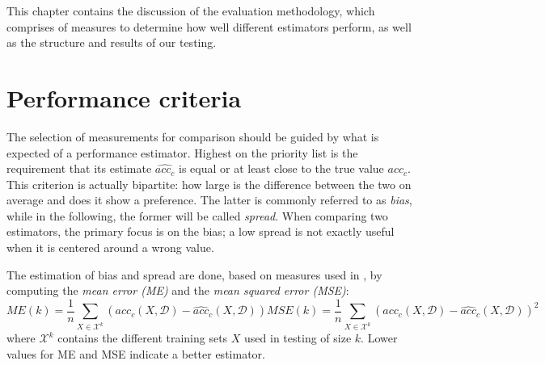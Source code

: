 \label{evaluation}

This chapter contains the discussion of the evaluation methodology, which comprises of measures to determine how well different estimators perform, as well as the structure and results of our testing.

\section{Performance criteria}
\label{evaluation:objective}

The selection of measurements for comparison should be guided by what is expected of a performance estimator. Highest on the priority list is the requirement that its estimate $\widehat{acc_c}$ is equal or at least close to the true value $acc_c$. This criterion is actually bipartite: how large is the difference between the two on average and does it show a preference. The latter is commonly referred to as \textit{bias}, while in the following, the former will be called \textit{spread}. When comparing two estimators, the primary focus is on the bias; a low spread is not exactly useful when it is centered around a wrong value.

The estimation of bias and spread are done, based on measures used in \cite{FigueroaEtal2012}, by computing the \textit{mean error (ME)} and the \textit{mean squared error (MSE)}:
\begin{subequations}
\begin{equation}
ME(k) = \frac{1}{n} \sum_{X \in \mathcal{X}^k}^{} \left(acc_c(X,\mathcal{D}) - \widehat{acc}_c(X,\mathcal{D})\right)
\end{equation}
\begin{equation}
MSE(k) = \frac{1}{n} \sum_{X \in \mathcal{X}^k}^{} \left(acc_c(X,\mathcal{D}) - \widehat{acc}_c(X,\mathcal{D})\right)^2
\end{equation}
\end{subequations}
where $\mathcal{X}^k$ contains the different training sets $X$ used in testing of size $k$. Lower values for ME and MSE indicate a better estimator.

